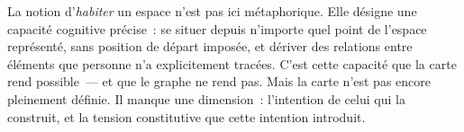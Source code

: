 La notion d'\emph{habiter} un espace n'est pas ici métaphorique. Elle désigne
une capacité cognitive précise~: se situer depuis n'importe quel point de l'espace
représenté, sans position de départ imposée, et dériver des relations entre
éléments que personne n'a explicitement tracées. C'est cette capacité que la carte
rend possible~--- et que le graphe ne rend pas. Mais la carte n'est pas encore
pleinement définie. Il manque une dimension~: l'intention de celui qui la construit,
et la tension constitutive que cette intention introduit.